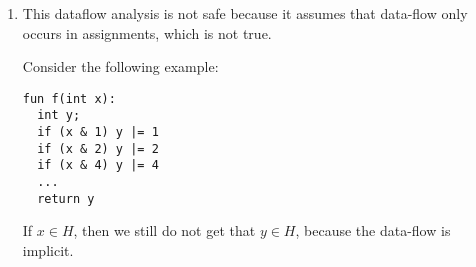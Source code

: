 \begin{enumerate}[label=(\alph*)]
\begin{enumerate}[label=(\roman*)]
\item
  This dataflow analysis is not safe because it assumes that data-flow only occurs in assignments, which is not true.

  Consider the following example:

\begin{verbatim}
fun f(int x):
  int y;
  if (x & 1) y |= 1
  if (x & 2) y |= 2
  if (x & 4) y |= 4
  ...
  return y
\end{verbatim}

If $x \in H$, then we still do not get that $y \in H$, because the data-flow is implicit.

        
    \end{enumerate}
        
\end{enumerate}

